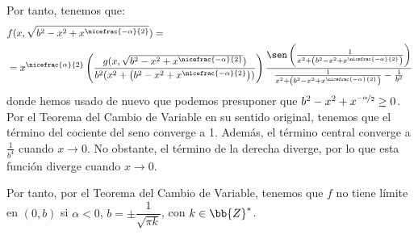 \begin{ejercicio}
\begin{enumerate}
\begin{enumerate}
            Por tanto, tenemos que:
            \begin{align*}
                &f(x,\sqrt{b^2-x^2+x^{\nicefrac{-\alpha}{2}}})
                =\\&= x^{\nicefrac{\alpha}{2}} \left(\frac{g(x,\sqrt{b^2-x^2+x^{\nicefrac{-\alpha}{2}}})}{b^2(x^2+\left(b^2-x^2+x^{\nicefrac{-\alpha}{2}}\right))}\right) \frac{\sen\left(\frac{1}{x^2+\left(b^2-x^2+x^{\nicefrac{-\alpha}{2}}\right)}\right)}{\frac{1}{x^2+\left(b^2-x^2+x^{\nicefrac{-\alpha}{2}}\right)} - \frac{1}{b^2}}
            \end{align*}
            donde hemos usado de nuevo que podemos presuponer que $b^2-x^2+x^{\nicefrac{-\alpha}{2}}\geq 0$.
            Por el Teorema del Cambio de Variable en su sentido original,
            tenemos que el término del cociente del seno converge a 1.
            Además, el término central converge a $\frac{1}{b^4}$ cuando $x\to 0$.
            No obstante, el término de la derecha diverge, por lo que esta función diverge cuando $x\to 0$.

            Por tanto, por el Teorema del Cambio de Variable, tenemos que $f$ no tiene límite en $(0,b)$ si $\alpha<0$, $b= \pm \dfrac{1}{\sqrt{\pi k}}$, con $k\in \bb{Z}^\ast$.
        \end{enumerate}
    \end{enumerate}
\end{ejercicio}


